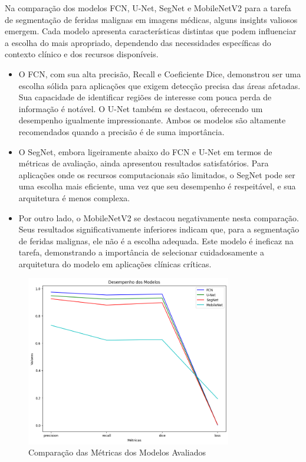     Na comparação dos modelos \ac{FCN}, \ac{U-Net}, \ac{SegNet} e \ac{MobileNetV2} para a tarefa de segmentação de feridas malignas em imagens médicas, alguns insights valiosos emergem. Cada modelo apresenta características distintas que podem influenciar a escolha do mais apropriado, dependendo das necessidades específicas do contexto clínico e dos recursos disponíveis.

    \begin{itemize}
        \item O \ac{FCN}, com sua alta precisão, Recall e Coeficiente Dice, demonstrou ser uma escolha sólida para aplicações que exigem detecção precisa das áreas afetadas. Sua capacidade de identificar regiões de interesse com pouca perda de informação é notável. O \ac{U-Net} também se destacou, oferecendo um desempenho igualmente impressionante. Ambos os modelos são altamente recomendados quando a precisão é de suma importância.

        \item O \ac{SegNet}, embora ligeiramente abaixo do \ac{FCN} e \ac{U-Net} em termos de métricas de avaliação, ainda apresentou resultados satisfatórios. Para aplicações onde os recursos computacionais são limitados, o \ac{SegNet} pode ser uma escolha mais eficiente, uma vez que seu desempenho é respeitável, e sua arquitetura é menos complexa.

        \item Por outro lado, o \ac{MobileNetV2} se destacou negativamente nesta comparação. Seus resultados significativamente inferiores indicam que, para a segmentação de feridas malignas, ele não é a escolha adequada. Este modelo é ineficaz na tarefa, demonstrando a importância de selecionar cuidadosamente a arquitetura do modelo em aplicações clínicas críticas.
    \end{itemize}
    
     \begin{figure}[H]
            \centering
            \includegraphics[width=0.8\textwidth]{img/results_metrics_models.png}
            \caption{ Comparação das Métricas dos Modelos Avaliados }
            \label{fig:graphResultsModels}
     \end{figure}

